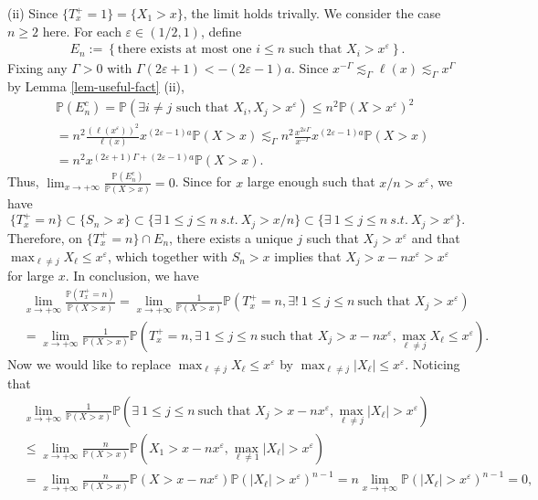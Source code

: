 \documentclass[11pt]{article}
\numberwithin{equation}{section}
\begin{document}
 (ii) Since $\{T_x^+=1\}= \{X_1>x\}$, the limit holds trivally. We consider the case $n\geq 2$ here. 
 For each $\varepsilon\in (1/2,1)$, define 
 \begin{align}\label{def-of-E-n}
 E_n:= \left\{ \mbox{there exists at most one }i \leq n \mbox{ such that } X_i>x^\varepsilon \right\}.
 \end{align}
 Fixing any $\Gamma>0$ with $\Gamma(2\varepsilon+1)<-(2\varepsilon-1)a$. Since $x^{-\Gamma}\lesssim_\Gamma \ell(x)\lesssim_\Gamma x^\Gamma$ by Lemma \ref{lem-useful-fact} (ii),  
 \begin{align}\label{e4'}
 & \mathbb{P}\left(E_n^c\right) =\mathbb{P}\left(\exists i\neq j \mbox{ such that } X_i, X_j>x^\varepsilon \right)\leq n^2 \mathbb{P}(X>x^\varepsilon)^2 \nonumber\\
 &= n^2\frac{\left(\ell(x^\varepsilon)\right)^2}{\ell(x)} x^{(2\varepsilon-1)a}  \mathbb{P}(X>x) \lesssim_\Gamma n^2\frac{x^{2\varepsilon \Gamma}}{x^{-\Gamma}} x^{(2\varepsilon-1)a}  \mathbb{P}(X>x) \nonumber\\
 & = n^{2} x^{(2\varepsilon+1)\Gamma +(2\varepsilon-1)a} \mathbb{P}(X>x). 
 \end{align}
 Thus,    $\lim_{x\to +\infty} \frac{\mathbb{P}(E_n^c)}{\mathbb{P}(X>x)} =0$. 
 Since for $x$ large enough such that $x/n>x^{\varepsilon}$,  we have
 \[
 \{T_x^+=n\}\subset \{S_n>x\}\subset \{\exists\ 1\leq j\leq n\ s.t.\ X_j>x/n \}\subset \{\exists\ 1\leq j\leq n\ s.t.\ X_j>x^{\varepsilon} \}.
 \]
 Therefore, on $\{T_x^+=n\}\cap E_n$, there exists a unique $j$ such that $X_j>x^\varepsilon$ and that $\max_{\ell\neq j} X_\ell \leq x^{\varepsilon}$, which together with $S_n >x$ implies that $X_j> x-nx^\varepsilon>x^\varepsilon$ for large $x$. In conclusion, we have  
\begin{align}\label{e4}
	& \lim_{x\to +\infty} \frac{\mathbb{P}(T_x^+ =n)}{\mathbb{P}(X>x)}   =\lim_{x\to +\infty} \frac{1}{\mathbb{P}(X>x)}\mathbb{P}\left(T_x^+=n, \exists !\ 1\leq j\leq n\ \mbox{such that } X_j>x^\varepsilon \right) \nonumber\\
	&= \lim_{x\to +\infty} \frac{1}{\mathbb{P}(X>x)} \mathbb{P}\left(T_x^+=n, \exists \ 1\leq j\leq n\ \mbox{such that } X_j>x- nx^\varepsilon, \max_{\ell\neq j} X_\ell \leq x^\varepsilon \right). 
\end{align}
Now we would like to replace $\max_{\ell\neq j} X_\ell \leq x^\varepsilon $ by $\max_{\ell\neq j} |X_\ell| \leq x^\varepsilon $. Noticing that 
\begin{align}\label{e11-3}
	 & \lim_{x\to +\infty} \frac{1}{\mathbb{P}(X>x)}\mathbb{P}\left(\exists \ 1\leq j\leq n\ \mbox{such that } X_j>x- nx^\varepsilon, \max_{\ell\neq j} |X_\ell| > x^\varepsilon \right) \nonumber\\
	 &\leq \lim_{x\to +\infty} \frac{n}{\mathbb{P}(X>x)} \mathbb{P}\left(X_1>x- nx^\varepsilon, \max_{\ell\neq 1} |X_\ell| > x^\varepsilon \right)\nonumber\\
	 &=  \lim_{x\to +\infty} \frac{n}{\mathbb{P}(X>x)}\mathbb{P}\left(X>x- nx^\varepsilon\right)\mathbb{P}\left(  |X_\ell| > x^\varepsilon \right)^{n-1} = n \lim_{x\to +\infty} \mathbb{P}\left(  |X_\ell| > x^\varepsilon \right)^{n-1}  =0,
\end{align}
\end{document}
